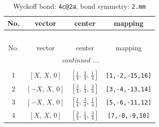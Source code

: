 \documentclass[fleqn,8pt]{jsarticle}
\begin{document}
\renewcommand{\arraystretch}{1.2}
\begin{longtable}{cccc}
\caption{Wyckoff bond: {\tt 4c@2a}, bond symmetry: {\tt 2.mm}}
 \\
 \hline \hline
No. & vector & center & mapping \\ \hline \endfirsthead

\multicolumn{3}{l}{\tablename\ \thetable{}} \\
 \hline \hline
No. & vector & center & mapping \\ \hline \endhead

 \hline \hline
\multicolumn{3}{r}{\footnotesize\it continued ...} \\ \endfoot

 \hline \hline
\multicolumn{3}{r}{} \\ \endlastfoot

1 & $\left[ X,\, X,\, 0 \right]$ & $\left[ \frac{1}{4},\, \frac{3}{4},\, \frac{1}{4} \right]$ & {\tt [1,-2,-15,16]} \\ \hline
2 & $\left[ - X,\, X,\, 0 \right]$ & $\left[ \frac{3}{4},\, \frac{1}{4},\, \frac{3}{4} \right]$ & {\tt [3,-4,-13,14]} \\ \hline
3 & $\left[ - X,\, X,\, 0 \right]$ & $\left[ \frac{1}{4},\, \frac{3}{4},\, \frac{1}{4} \right]$ & {\tt [5,-6,-11,12]} \\ \hline
4 & $\left[ X,\, X,\, 0 \right]$ & $\left[ \frac{3}{4},\, \frac{1}{4},\, \frac{3}{4} \right]$ & {\tt [7,-8,-9,10]} \\
\end{longtable}
\renewcommand{\arraystretch}{1.2}
\end{document}
